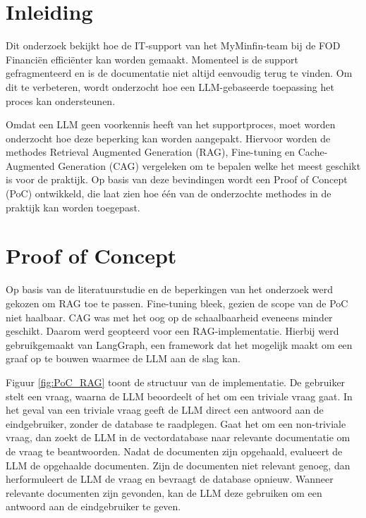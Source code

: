 \documentclass[a0,portrait]{hogent-poster}
\begin{document}
\begin{multicols}{2} %

\section{Inleiding}

Dit onderzoek bekijkt hoe de IT-support van het MyMinfin-team bij de FOD Financiën efficiënter kan worden gemaakt. Momenteel is de support gefragmenteerd en is de documentatie niet altijd eenvoudig terug te vinden. Om dit te verbeteren, wordt onderzocht hoe een LLM-gebaseerde toepassing het proces kan ondersteunen.

Omdat een LLM geen voorkennis heeft van het supportproces, moet worden onderzocht hoe deze beperking kan worden aangepakt. Hiervoor worden de methodes Retrieval Augmented Generation (RAG), Fine-tuning en Cache-Augmented Generation (CAG) vergeleken om te bepalen welke het meest geschikt is voor de praktijk. Op basis van deze bevindingen wordt een Proof of Concept (PoC) ontwikkeld, die laat zien hoe één van de onderzochte methodes in de praktijk kan worden toegepast.

\section{Proof of Concept}

Op basis van de literatuurstudie en de beperkingen van het onderzoek werd gekozen om RAG toe te passen. Fine-tuning bleek, gezien de scope van de PoC niet haalbaar. CAG was met het oog op de schaalbaarheid eveneens minder geschikt. Daarom werd geopteerd voor een RAG-implementatie. Hierbij werd gebruikgemaakt van LangGraph, een framework dat het mogelijk maakt om een graaf op te bouwen waarmee de LLM aan de slag kan.

Figuur \ref{fig:PoC_RAG} toont de structuur van de implementatie. De gebruiker stelt een vraag, waarna de LLM beoordeelt of het om een triviale vraag gaat. In het geval van een triviale vraag geeft de LLM direct een antwoord aan de eindgebruiker, zonder de database te raadplegen. Gaat het om een non-triviale vraag, dan zoekt de LLM in de vectordatabase naar relevante documentatie om de vraag te beantwoorden. Nadat de documenten zijn opgehaald, evalueert de LLM de opgehaalde documenten. Zijn de documenten niet relevant genoeg, dan herformuleert de LLM de vraag en bevraagt de database opnieuw. Wanneer relevante documenten zijn gevonden, kan de LLM deze gebruiken om een antwoord aan de eindgebruiker te geven.


\end{multicols}
\end{document}
